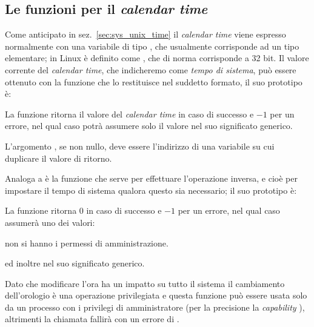 \subsection{Le funzioni per il \textit{calendar time}}
\label{sec:sys_time_base}


Come anticipato in sez.~\ref{sec:sys_unix_time} il \textit{calendar time}
viene espresso normalmente con una variabile di tipo , che
usualmente corrisponde ad un tipo elementare; in Linux è definito come
, che di norma corrisponde a 32 bit. Il valore corrente del
\textit{calendar time}, che indicheremo come \textsl{tempo di sistema}, può
essere ottenuto con la funzione  che lo restituisce nel suddetto
formato, il suo prototipo è:

\begin{funcproto}{
}

{La funzione ritorna il valore del \textit{calendar time} in caso di successo
  e $-1$ per un errore, nel qual caso  potrà assumere solo il
  valore  nel suo significato generico.}
\end{funcproto}

L'argomento , se non nullo, deve essere l'indirizzo di una variabile
su cui duplicare il valore di ritorno.

Analoga a  è la funzione  che serve per effettuare
l'operazione inversa, e cioè per impostare il tempo di sistema qualora questo
sia necessario; il suo prototipo è:

\begin{funcproto}{
}

{La funzione ritorna $0$ in caso di successo e $-1$ per un errore, nel qual
  caso  assumerà uno dei valori: 
  \begin{errlist}
  \item[\errcode{EPERM}] non si hanno i permessi di amministrazione.
  \end{errlist}
  ed inoltre  nel suo significato generico.}
\end{funcproto}


Dato che modificare l'ora ha un impatto su tutto il sistema il cambiamento
dell'orologio è una operazione privilegiata e questa funzione può essere usata
solo da un processo con i privilegi di amministratore (per la precisione la
\textit{capability} ), altrimenti la chiamata fallirà
con un errore di .

